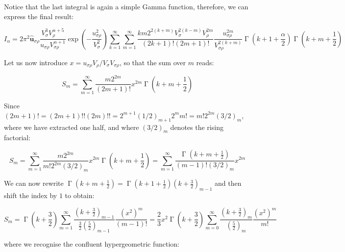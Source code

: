 Notice that the last integral is again a simple Gamma function, therefore, we can express the final result:

\begin{equation*}
{I}_\alpha=2\pi^2 \mathbf{\hat{u}}_{\sigma\rho} \frac{V_\sigma^3 V_\rho^{\alpha+5}}{u_{\sigma\rho} V_{\sigma\rho}^{\alpha+1}} \exp{\left(-\frac{u_{\sigma\rho}^2}{V_\sigma^2}\right)} \sum_{k=1}^\infty \sum_{m=1}^\infty \frac{km2^{2(k+m)}V_\sigma^{2(k-m)}V_\rho^{2m}}{(2k+1)! (2m+1)!}\frac{u_{\sigma\rho}^{2m}}{V_{\sigma\rho}^{2(k+m)}}\operatorname{\Gamma}{\left(k+1+\frac{\alpha}{2}\right)} \operatorname{\Gamma}{\left(k+m+\frac{1}{2}\right)}
\end{equation*}

Let us now introduce $x=u_{\sigma\rho}V_\rho/V_\sigma V_{\sigma\rho}$, so that the sum over $m$ reads:

\begin{equation*}
    S_m=\sum_{m=1}^\infty \frac{m2^{2m}}{(2m+1)!}x^{2m}\operatorname{\Gamma}{\left(k+m+\frac{1}{2}\right)}
\end{equation*}

Since $(2m+1)! = (2m+1)!!(2m)!! = 2^{m+1} \left(1/2\right)_{m+1} 2^m m! = m! 2^{2m}\left(3/2\right)_m$, where we have extracted one half, and where $(3/2)_m$ denotes the rising factorial:

\begin{equation*}
    S_m=\sum_{m=1}^\infty \frac{m2^{2m}}{m! 2^{2m}(3/2)_m}x^{2m}\operatorname{\Gamma}{\left(k+m+\frac{1}{2}\right)}=\sum_{m=1}^\infty \frac{\operatorname{\Gamma}{\left(k+m+\frac{1}{2}\right)}}{(m-1)!(3/2)_{m}}x^{2m}
\end{equation*}

We can now rewrite $\operatorname{\Gamma}{\left(k+m+\frac{1}{2}\right)}=\operatorname{\Gamma}{\left(k+1+\frac{1}{2}\right)}(k+\frac{3}{2})_{m-1}$ and then shift the index by $1$ to obtain:

\begin{equation*}
    S_m=\operatorname{\Gamma}{\left(k+\frac{3}{2}\right)}\sum_{m=1}^\infty \frac{\left(k+\frac{3}{2}\right)_{m-1}}{\frac{3}{2}\left(\frac{5}{2}\right)_{m-1}}\frac{\left(x^2\right)^m}{(m-1)!}=\frac{2}{3}x^2\operatorname{\Gamma}{\left(k+\frac{3}{2}\right)}\sum_{m=0}^\infty \frac{\left(k+\frac{3}{2}\right)_{m}}{\left(\frac{5}{2}\right)_{m}}\frac{\left(x^2\right)^{m}}{m!}
\end{equation*}

where we recognise the confluent hypergeometric function:


